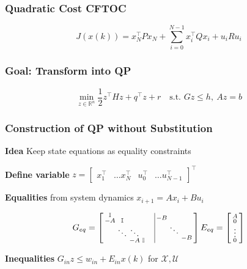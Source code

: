 \subsubsection{Quadratic Cost CFTOC}
\[
	J(x(k)) = x_N^\top P x_N + \sum_{i=0}^{N-1}x_i^\top Q x_i + u_i R u_i
\]
\subsubsection{Goal: Transform  into QP}
\[
	\min_{z\in\mathbb{R}^n}
	\textstyle\frac{1}{2}z^\top H z + q^\top z + r
	\quad\text{s.t. }Gz\leq h,\ Az = b\]

\subsubsection{Construction of QP without Substitution}

\textbf{Idea} Keep state equations as equality constraints

\textbf{Define variable} $z =
	\begin{bmatrix}
		x_1^\top & \dots x_N^\top & u_0^\top & \dots u_{N-1}^\top
	\end{bmatrix}^\top$

\textbf{Equalities} from system dynamics
$x_{i+1} = Ax_i + Bu_i$

\[
	G_{eq} =
	\begin{bmatrix}
		\begin{smallmatrix}
			\mathbb{I}& & & \\
			-A & \mathbb{I} && \\
			&  \ddots & \ddots \\
			&&-A & \mathbb{I}
		\end{smallmatrix}
		 & \vline
		\begin{smallmatrix}
			-B \\
			& \ddots \\
			& &-B
		\end{smallmatrix}
	\end{bmatrix}
	E_{eq} =
	\begin{bsmallmatrix}
		A      \\
		0      \\
		\vdots \\
		0
	\end{bsmallmatrix}
\]

\textbf{Inequalities}
$G_{in}z \leq w_{in} + E_{in}x(k)$
for $\mathcal{X},\mathcal{U}$

